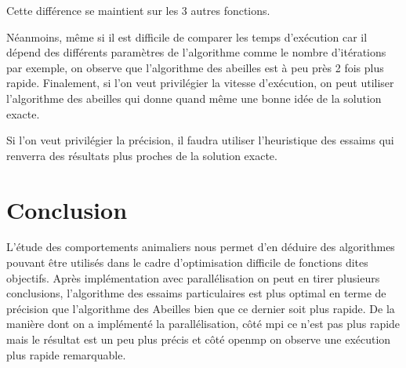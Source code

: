 \documentclass[12pt]{article}
\begin{document}
Cette différence se maintient sur les 3 autres fonctions.

Néanmoins, même si il est difficile de comparer les temps d'exécution car il dépend des différents paramètres de l'algorithme comme le nombre d'itérations par exemple, on observe que l'algorithme des abeilles est à peu près 2 fois plus rapide.
\newline
\newline
Finalement, si l'on veut privilégier la vitesse d'exécution, on peut utiliser l'algorithme des abeilles qui donne quand même une bonne idée de la solution exacte.

Si l'on veut privilégier la précision, il faudra utiliser l'heuristique des essaims qui renverra des résultats plus proches de la solution exacte. 

\newpage
\section*{Conclusion}%

L'étude des comportements animaliers nous permet d'en déduire des algorithmes pouvant être utilisés dans le cadre d'optimisation difficile de fonctions dites objectifs. Après implémentation avec parallélisation on peut en tirer plusieurs conclusions, l'algorithme des essaims particulaires est plus optimal en terme de précision que l'algorithme des Abeilles bien que ce dernier soit plus rapide. De la manière dont on a implémenté la parallélisation, côté mpi ce n'est pas plus rapide mais le résultat est un peu plus précis et côté openmp on observe une exécution plus rapide remarquable.



\nocite{*}


\end{document}
